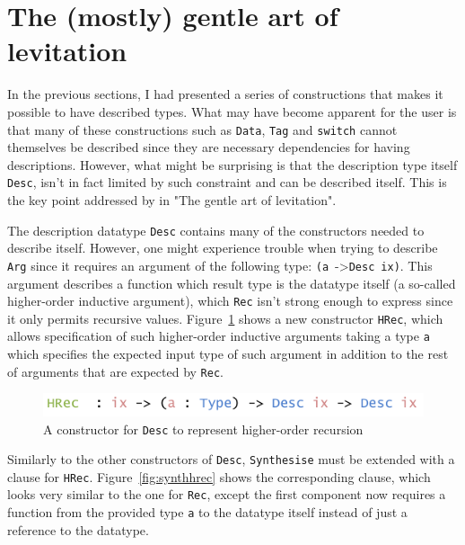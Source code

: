 \documentclass{ituthesis}
\newcommand{\ttconstructor}[1]{\textcolor{constructor-color}{\texttt{#1}}}
\newcommand{\tttype}[1]{\textcolor{type-color}{\texttt{#1}}}
\newcommand{\ttdec}[1]{\textcolor{declared-var-color}{\texttt{#1}}}
\newcommand{\ttvar}[1]{\textcolor{local-var-color}{\texttt{#1}}}
\theoremstyle{definition}
\begin{document}
\section{The (mostly) gentle art of levitation}
\label{sec:TheMostlyGentleArtofLevitation}
In the previous sections, I had presented a series of constructions that makes it possible to have described types.
What may have become apparent for the user is that many of these constructions such as \tttype{Data}, \tttype{Tag} and \ttdec{switch} cannot themselves be described since
they are necessary dependencies for having descriptions.
However, what might be surprising is that the description type itself \tttype{Desc}, isn't in fact limited by such constraint
and can be described itself.
This is the key point addressed by \cite{Chapman:2010:GAL:1863543.1863547} in "The gentle art of levitation".

The description datatype \tttype{Desc} contains many of the constructors needed to describe itself.
However, one might experience trouble when trying to describe \ttconstructor{Arg} since it requires an argument of the following type:
\texttt{(}\ttvar{a}~->\tttype{Desc}~\ttvar{ix}\texttt{)}.
This argument describes a function which result type is the datatype itself (a so-called higher-order inductive argument), which \ttconstructor{Rec} isn't strong enough to express since it only permits recursive values.
Figure~\ref{fig:deschrec} shows a new constructor \ttconstructor{HRec}, which allows specification of such higher-order inductive arguments taking a type \ttvar{a} which specifies
the expected input type of such argument in addition to the rest of arguments that are expected by \ttconstructor{Rec}.

\begin{figure}[ht]
\begin{center}
    \includegraphics[scale=0.5]{Figures/ADescriptionForDatatypesExtended.png}
\end{center}
\caption{A constructor for \tttype{Desc} to represent higher-order recursion}
\label{fig:deschrec}
\end{figure}

Similarly to the other constructors of \tttype{Desc}, \ttdec{Synthesise} must be extended with a clause for \ttconstructor{HRec}. Figure~\ref{fig:synthhrec} shows the corresponding clause,
which looks very similar to the one for \ttconstructor{Rec}, except the first component now requires a function from the provided type \ttvar{a} to the datatype itself instead of just a reference
to the datatype.
\end{document}
